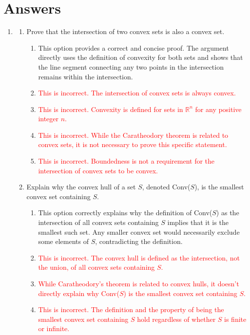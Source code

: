 \documentclass{article}%
\newcommand{\incorrect}[1]{\textcolor{red}{#1}}
\begin{document}
\section{Answers}%
\label{sec:Answers}%
\begin{enumerate}%
\item%
\begin{enumerate}%
\item Prove that the intersection of two convex sets is also a convex set.%
\begin{enumerate}%
\item This option provides a correct and concise proof.  The argument directly uses the definition of convexity for both sets and shows that the line segment connecting any two points in the intersection remains within the intersection.%
\item \incorrect{This is incorrect. The intersection of convex sets is always convex.}%
\item \incorrect{This is incorrect. Convexity is defined for sets in $\mathbb{R}^n$ for any positive integer $n$.}%
\item \incorrect{This is incorrect. While the Caratheodory theorem is related to convex sets, it is not necessary to prove this specific statement.}%
\item \incorrect{This is incorrect. Boundedness is not a requirement for the intersection of convex sets to be convex.}%
\end{enumerate}%
\vspace{0.5em}%
\item Explain why the convex hull of a set $S$, denoted Conv($S$), is the smallest convex set containing $S$.%
\begin{enumerate}%
\item This option correctly explains why the definition of Conv($S$) as the intersection of all convex sets containing $S$ implies that it is the smallest such set.  Any smaller convex set would necessarily exclude some elements of $S$, contradicting the definition.%
\item \incorrect{This is incorrect. The convex hull is defined as the intersection, not the union, of all convex sets containing $S$.}%
\item \incorrect{While Caratheodory's theorem is related to convex hulls, it doesn't directly explain why Conv($S$) is the smallest convex set containing $S$.}%
\item \incorrect{This is incorrect. The definition and the property of being the smallest convex set containing $S$ hold regardless of whether $S$ is finite or infinite.}%

\end{enumerate}
\end{enumerate}
\end{enumerate}
\end{document}

